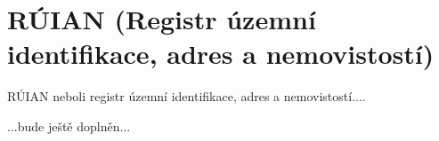 \chapter{RÚIAN (Registr územní identifikace, adres a nemovistostí)}
\label{2-ruian}

RÚIAN neboli registr územní identifikace, adres a nemovistostí....

...bude ještě doplněn...


